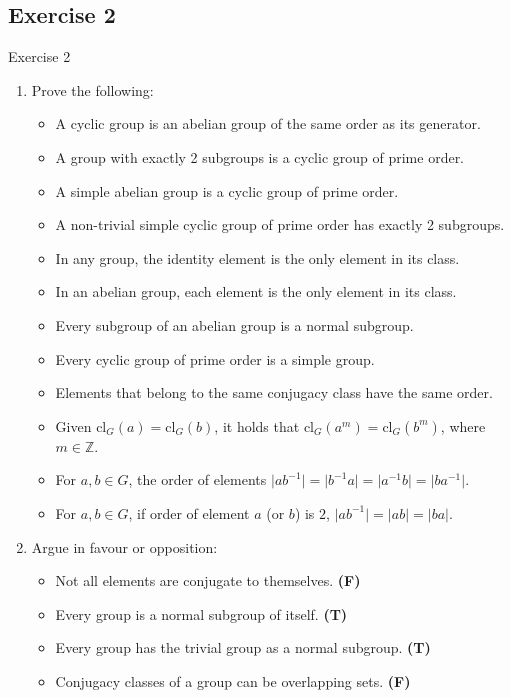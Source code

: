 \documentclass{beamer}
\newcounter{savedenum}
\newcommand*{\saveenum}{\setcounter{savedenum}{\theenumi}}
\begin{document}
\subsection{Exercise 2}

\begin{frame}{Exercise 2}
    \begin{enumerate}
        \item Prove the following:
        \begin{itemize}
            \item A cyclic group is an abelian group of the same order as its generator.
            \item A group with exactly 2 subgroups is a cyclic group of prime order.
            \item A simple abelian group is a cyclic group of prime order.
            \item A non-trivial simple cyclic group of prime order has exactly 2 subgroups.
            \item In any group, the identity element is the only element in its class.
            \item In an abelian group, each element is the only element in its class.
            \item Every subgroup of an abelian group is a normal subgroup.
            \item Every cyclic group of prime order is a simple group.
            \item Elements that belong to the same conjugacy class have the same order.
            \item Given $\text{cl}_G(a)=\text{cl}_G(b)$, it holds that $\text{cl}_G(a^m)=\text{cl}_G(b^m)$, where $m\in\mathbb{Z}$.
            \item For $a,b\in G$, the order of elements $\lvert ab^{-1}\rvert=\lvert b^{-1}a\rvert=\lvert a^{-1}b\rvert=\lvert ba^{-1}\rvert$.
            \item For $a,b\in G$, if order of element $a$ (or $b$) is $2$, $\lvert ab^{-1}\rvert=\lvert ab\rvert=\lvert ba\rvert$.
        \end{itemize}
        \item Argue in favour or opposition:
        \begin{itemize}
            \item Not all elements are conjugate to themselves. \textbf{(F)}
            \item Every group is a normal subgroup of itself. \textbf{(T)}
            \item Every group has the trivial group as a normal subgroup. \textbf{(T)}
            \item Conjugacy classes of a group can be overlapping sets. \textbf{(F)}
        \end{itemize}
        \saveenum
    \end{enumerate}
\end{frame}
\end{document}
